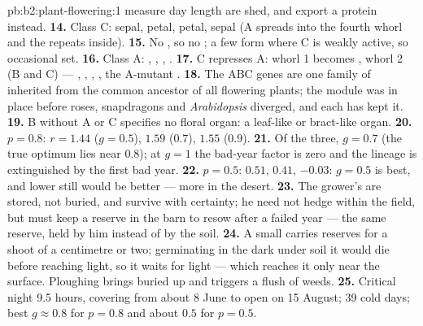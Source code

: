 \begin{solution}{pb:b2:plant-flowering:1}
measure day length are shed, and export a protein instead.
\textbf{14.} Class C: sepal, petal, petal, sepal (A spreads into the
fourth whorl and the  repeats inside).
\textbf{15.} No , so no ; a few  form where C is
weakly active, so occasional  set.
\textbf{16.} Class A: , , , .
\textbf{17.} C represses A: whorl 1 becomes , whorl 2 (B and C)
 --- , , , , the A-mutant .
\textbf{18.} The ABC genes are one family of 
inherited from the common ancestor of all flowering plants; the
module was in place before roses, snapdragons and \emph{Arabidopsis}
diverged, and each has kept it.
\textbf{19.} B without A or C specifies no floral organ: a leaf-like
or bract-like organ.
\textbf{20.} $p = 0.8$: $r = 1.44$ ($g = 0.5$), $1.59$ ($0.7$), $1.55$
($0.9$).
\textbf{21.} Of the three, $g = 0.7$ (the true optimum lies near
$0.8$); at $g = 1$ the bad-year factor is zero and the lineage is
extinguished by the first bad year.
\textbf{22.} $p = 0.5$: $0.51$, $0.41$, $-0.03$: $g = 0.5$ is best,
and lower still would be better --- more  in the desert.
\textbf{23.} The grower's  are stored, not buried, and survive
with certainty; he need not hedge within the field, but must keep a
reserve in the barn to resow after a failed year --- the same
reserve, held by him instead of by the soil.
\textbf{24.} A small  carries reserves for a shoot of a
centimetre or two; germinating in the dark under soil it would die
before reaching light, so it waits for light --- which reaches it
only near the surface. Ploughing brings buried  up and
triggers a flush of weeds.
\textbf{25.} Critical night 9.5 hours, covering from about 8 June to
open on 15 August; 39 cold days; best $g \approx 0.8$ for $p = 0.8$
and about $0.5$ for $p = 0.5$.
\end{solution}
